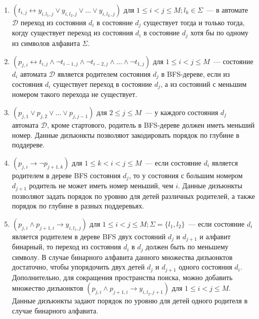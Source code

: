 \begin{enumerate}
  \item $\left(t_{i,j} \leftrightarrow y_{i,l_{1},j} \vee y_{i,l_{2},j} \vee \ldots \vee y_{i,l_{L},j} \right)$ для $1 \leq i < j \leq M; l_{k} \in \Sigma$~--- в автомате $\mathcal{D}$ переход из состояния $d_{i}$ в состояние $d_{j}$ существует тогда и только тогда, когду существует переход из состояния $d_{i}$ в состояние $d_{j}$ хотя бы по одному из символов алфавита $\Sigma$.
  
  \item $\left(p_{j,i} \leftrightarrow t_{i,j} \wedge \neg t_{i - 1,j} \wedge \neg t_{i - 2, j} \wedge \ldots \wedge \neg t_{1,j}\right)$ для $1 \leq i < j \leq M$~{---} состояние $d_{i}$ автомата $\mathcal{D}$ является родителем состояния $d_{j}$ в BFS-дереве, если из состояния $d_{i}$ существует переход в состояние $d_{j}$, а из состояний с меньшим номером такого перехода не существует.
  
  \item $\left(p_{j,1} \vee p_{j,2} \vee \ldots \vee p_{j,j - 1}\right)$ для $2 \leq j \leq M$~{---} у каждого состояния $d_{j}$ автомата $\mathcal{D}$, кроме стартового, родитель в BFS-дереве должен иметь меньший номер. 
  Данные дизъюнкты позволяют закодировать порядок по глубине в поддереве.

  \item $\left(p_{j,i} \rightarrow \neg p_{j + 1, k}\right)$ для $1 \leq k < i < j \leq M$~{---} если состояние $d_{i}$ является родителем в дереве BFS состояния $d_{j}$, то у состояния с б\emph{о}льшим номером $d_{j + 1}$ родитель не может иметь номер меньший, чем $i$. 
  Данные дизъюнкты позволяют задать порядок по уровню для детей различных родителей, а также порядок по глубине в разных поддеревьях.
  
  \item $\left(p_{j,i} \wedge p_{j + 1, i} \rightarrow y_{i,l_{1},j}\right)$ для $1 \leq i < j \leq M;\Sigma=\{l_{1},l_{2}\}$~{---} если состояние $d_i$ является родителем в дереве BFS двух состояний $d_{j}$ и $d_{j+1}$ и алфавит бинарный, то переход из состояния $d_{i}$ в $d_{j}$ должен быть по меньшему символу.
  В случае бинарного алфавита данного множества дизъюнктов достаточно, чтобы упорядочить двух детей $d_{j}$ и $d_{j + 1}$ одного состояния $d_{i}$. 
  Дополнительно, для сокращения пространства поиска, можно добавить множество дизъюнктов $\left(p_{j,i} \wedge p_{j + 1, i} \rightarrow y_{i,l_{2},j + 1}\right)$ для $1 \leq i < j \leq M$. 
  Данные дизъюнкты задают порядок по уровню для детей одного родителя в случае бинарного алфавита.


\end{enumerate}
